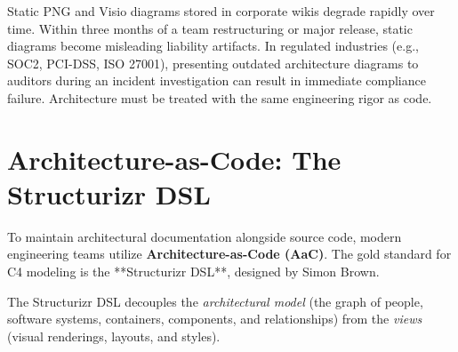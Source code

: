 \begin{productionwarningbox}
Static PNG and Visio diagrams stored in corporate wikis degrade rapidly over time. Within three months of a team restructuring or major release, static diagrams become misleading liability artifacts. In regulated industries (e.g., SOC2, PCI-DSS, ISO 27001), presenting outdated architecture diagrams to auditors during an incident investigation can result in immediate compliance failure. Architecture must be treated with the same engineering rigor as code.
\end{productionwarningbox}

\section{Architecture-as-Code: The Structurizr DSL}

To maintain architectural documentation alongside source code, modern engineering teams utilize \textbf{Architecture-as-Code (AaC)}. The gold standard for C4 modeling is the **Structurizr DSL**, designed by Simon Brown. 

The Structurizr DSL decouples the \textit{architectural model} (the graph of people, software systems, containers, components, and relationships) from the \textit{views} (visual renderings, layouts, and styles).

